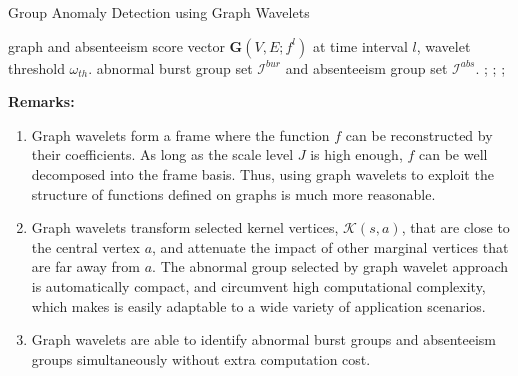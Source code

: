\begin{algorithm}[t]
\centering
\captionsetup{font=scriptsize}
\caption{Group Anomaly Detection using Graph Wavelets}
{\footnotesize \begin{algorithmic}[1]
 graph and absenteeism score vector $\mathbf{G}(V,E;f^l)$ at time interval $l$, wavelet threshold $\omega_{th}$.
 abnormal burst group set $\mathcal{I}^{bur}$ and absenteeism group set $\mathcal{I}^{abs}$.	;
;
	    ;
	    \ENDIF
	
	    \ENDIF	
	
\ENDFOR	
{}
\end{algorithmic}}
\label{algo:event_detection1}
\end{algorithm}


{\textbf{Remarks:}}
\begin{enumerate}
\item Graph wavelets form a frame where the function $f$ can be reconstructed by their coefficients.
As long as the scale level $J$ is high enough, $f$ can be well decomposed into the frame basis. Thus, using graph wavelets to exploit the structure of functions defined on graphs is much more reasonable.
\item Graph wavelets transform selected kernel vertices, $\mathcal{K}(s,a)$, that are close to the central vertex $a$, and attenuate the impact of other marginal vertices that are far away from $a$. The abnormal group selected by graph wavelet approach is automatically compact, and circumvent high computational complexity, which makes is easily adaptable to a wide variety of application scenarios.
\item Graph wavelets are able to identify abnormal burst groups and absenteeism groups simultaneously without extra computation cost.
\end{enumerate}




